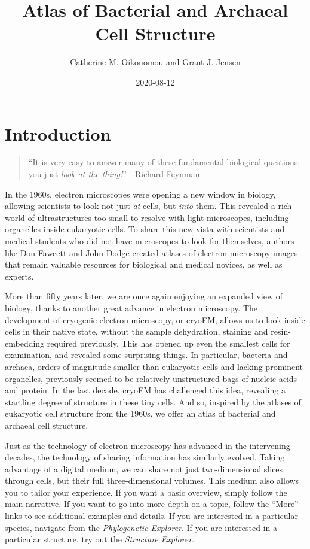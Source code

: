 \documentclass[]{tufte-book}
\title{Atlas of Bacterial and Archaeal Cell Structure}
\author{Catherine M. Oikonomou and Grant J. Jensen}
\date{2020-08-12}
\begin{document}
\maketitle



{
\setcounter{tocdepth}{1}
\tableofcontents
}

\chapter*{Introduction}\label{introduction}

\begin{quote}
``It is very easy to answer many of these fundamental biological
questions; you just \emph{look at the thing!}'' - Richard Feynman
\citep{feynman1959}
\end{quote}

In the 1960s, electron microscopes were opening a new window in biology,
allowing scientists to look not just \emph{at} cells, but \emph{into}
them. This revealed a rich world of ultrastructures too small to resolve
with light microscopes, including organelles inside eukaryotic cells. To
share this new vista with scientists and medical students who did not
have microscopes to look for themselves, authors like Don Fawcett
\citep{fawcett1966} and John Dodge \citep{dodge1968} created atlases of
electron microscopy images that remain valuable resources for biological
and medical novices, as well as experts.

More than fifty years later, we are once again enjoying an expanded view
of biology, thanks to another great advance in electron microscopy. The
development of cryogenic electron microscopy, or cryoEM, allows us to
look inside cells in their native state, without the sample dehydration,
staining and resin-embedding required previously. This has opened up
even the smallest cells for examination, and revealed some surprising
things. In particular, bacteria and archaea, orders of magnitude smaller
than eukaryotic cells and lacking prominent organelles, previously
seemed to be relatively unstructured bags of nucleic acids and protein.
In the last decade, cryoEM has challenged this idea, revealing a
startling degree of structure in these tiny cells. And so, inspired by
the atlases of eukaryotic cell structure from the 1960s, we offer an
atlas of bacterial and archaeal cell structure.

Just as the technology of electron microscopy has advanced in the
intervening decades, the technology of sharing information has similarly
evolved. Taking advantage of a digital medium, we can share not just
two-dimensional slices through cells, but their full three-dimensional
volumes. This medium also allows you to tailor your experience. If you
want a basic overview, simply follow the main narrative. If you want to
go into more depth on a topic, follow the ``More'' links to see
additional examples and details. If you are interested in a particular
species, navigate from the \emph{Phylogenetic Explorer}. If you are
interested in a particular structure, try out the \emph{Structure
Explorer}.
\end{document}
